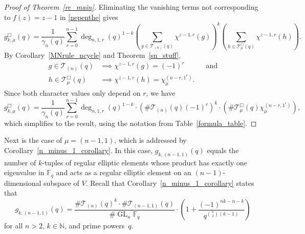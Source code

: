 \documentclass[Unicode,ALCO]{cedram}
\DeclareMathOperator{\GL}{GL}
\newcommand{\F}{\mathbb{F}}
\newcommand{\N}{\mathbb{N}}
\newcommand{\CT}{\mathcal{T}}
\begin{document}
\begin{proof}[Proof of Theorem~\ref{re_main}]
Eliminating the vanishing terms not corresponding to \(f(z) = z-1\) in \eqref{nepenthe} gives
\[
g_{k,\mu}^\Box (q)
=
\frac{1}{\gamma_n(q)}
\sum_{r = 0}^{n-1}
\deg_{n,1,r}(q)^{1-k}
\left (
\sum_{g \in \CT_{(n)} (q)} \chi^{z-1,r} (g)
\right )^k
\left (
\sum_{h \in \CT_\mu^\Box (q)} \chi^{z-1,r} (h)
\right ).
\]
By
Corollary~\ref{MNrule_ncycle}
and
Theorem~\ref{sn_stuff},
\begin{align*}
g \in \CT_{(n)} (q) & \implies \chi^{z-1,r}(g) = (-1)^r \quad \quad \quad \text{and}\\
h \in \CT_\mu^\Box (q)   & \implies \chi^{z-1,r}(h) = \chi^{(n-r,1^r)}_\mu.
\end{align*}
Since both character values only depend on \(r\), we have
\[
g_{k,\mu}^\Box (q)
=
\frac{1}{\gamma_n(q)}
\sum_{r = 0}^{n-1}
\deg_{n,1,r}(q)^{1-k}
\cdot
\left (
\# \CT_{(n)} (q) (-1)^r
\right )^k
\cdot
\left (
\# \CT_\mu^\Box (q) \chi^{(n-r,1^r)}_\mu
\right ),
\]
which simplifies to the result, using the notation from Table~\ref{formula_table}.
\end{proof}







































Next is the case of \(\mu = (n-1,1)\), which is addressed by Corollary~\ref{n_minus_1_corollary}.
In this case, \(g_{k,(n-1,1)} (q)\) equals the number of \(k\)-tuples of regular elliptic elements whose product has exactly one eigenvalue in \(\F_q\) and acts as a regular elliptic element on an \((n-1)\)-dimensional subspace of \(V\).
Recall that Corollary~\ref{n_minus_1_corollary} states that
\begin{equation}
g_{k,(n-1,1)} (q)
=
\frac{\# \CT_{(n)} (q)^k
\cdot
\# \CT_{(n-1,1)} (q)}{\# \GL_n \F_q}
\cdot
\left (
1 + \frac{(-1)^{nk-n-k}}{q^{\binom{n}{2}(k-1)}}
\right )
\end{equation}
for all \(n > 2\), \(k \in \N\), and prime powers~\(q\).
\end{document}
